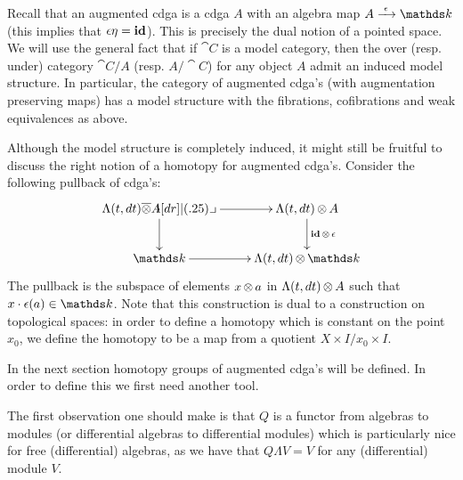 
Recall that an augmented cdga is a cdga $A$ with an algebra map $A \tot{\counit} \k$ (this implies that $\epsilon \eta = \mathbf{id}$). This is precisely the dual notion of a pointed space. We will use the general fact that if $\cat{C}$ is a model category, then the over (resp. under) category $\cat{C} / A$ (resp. $A / \cat{C}$) for any object $A$ admit an induced model structure. In particular, the category of augmented cdga's (with augmentation preserving maps) has a model structure with the fibrations, cofibrations and weak equivalences as above.

Although the model structure is completely induced, it might still be fruitful to discuss the right notion of a homotopy for augmented cdga's. Consider the following pullback of cdga's:
\[ \xymatrix{
	\Lambda(t, dt) \overline{\tensor} A \ar[r] \xypb \ar[d] & \Lambda(t, dt) \tensor A \ar[d]^{\id \tensor \counit} \\
	\k \ar[r] & \Lambda(t, dt) \tensor \k
}\]
The pullback is the subspace of elements $x \operatorname*{\otimes} a$ in $\Lambda(t, dt) \operatorname*{\otimes} A$ such that $x \cdot \counit(a) \in \k$. Note that this construction is dual to a construction on topological spaces: in order to define a homotopy which is constant on the point $x_0$, we define the homotopy to be a map from a quotient ${X \times I} / {x_0 \times I}$.

In the next section homotopy groups of augmented cdga's will be defined. In order to define this we first need another tool.

The first observation one should make is that $Q$ is a functor from algebras to modules (or differential algebras to differential modules) which is particularly nice for free (differential) algebras, as we have that $Q \Lambda V = V$ for any (differential) module $V$.

